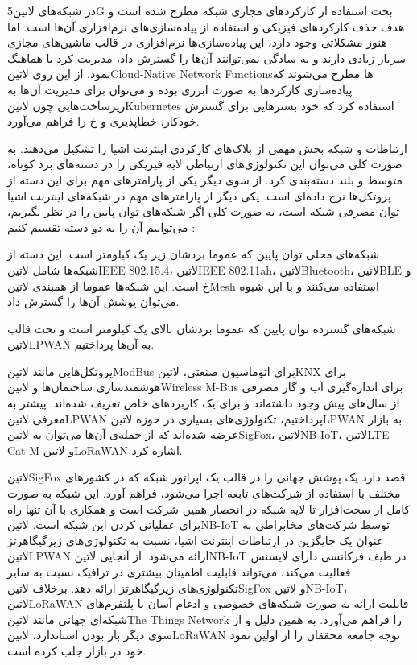 در شبکه‌های ‌لاتین{5G} بحث استفاده از کارکردهای مجازی شبکه مطرح شده است و هدف حذف کارکردهای فیزیکی
و استفاده از پیاده‌سازی‌های نرم‌افزاری آن‌ها است. اما هنوز مشکلاتی وجود دارد،
این پیاده‌سازی‌ها نرم‌افزاری در قالب ماشین‌های مجازی سربار زیادی دارند
و به سادگی نمی‌توانند آن‌ها را گسترش داد، مدیریت کرد یا هماهنگ نمود.
از این روی ‌لاتین{Cloud-Native Network Functions}ها مطرح می‌شوند که پیاده‌سازی کارکردها به صورت ابرزی بوده
و می‌توان برای مدیریت آن‌ها به زیرساخت‌هایی چون ‌لاتین{Kubernetes} استفاده کرد که خود بسترهایی برای
گسترش خودکار، خطاپذیری و ‌خ را فراهم می‌آورد.


ارتباطات و شبکه بخش مهمی از بلاک‌های کارکردی اینترنت اشیا را تشکیل می‌دهند. به صورت کلی می‌توان این تکنولوژی‌های ارتباطی لایه فیزیکی را در دسته‌های برد کوتاه، متوسط و بلند دسته‌بندی کرد.
از سوی دیگر یکی از پارامترهای مهم برای این دسته از پروتکل‌ها نرخ داده‌ای است. یکی دیگر از پارامترهای مهم در شبکه‌های اینترنت اشیا توان مصرفی شبکه است، به صورت کلی اگر شبکه‌های توان پایین را
در نظر بگیریم، می‌توانیم آن را به دو دسته تقسیم کنیم :

 شبکه‌های محلی توان پایین که عموما بردشان زیر یک کیلومتر است. این دسته از شبکه‌ها شامل ‌لاتین{IEEE 802.15.4}، ‌لاتین{IEEE 802.11ah}، ‌لاتین{Bluetooth}، ‌لاتین{BLE} و ‌خ است.
این شبکه‌ها عموما از همبندی ‌لاتین{Mesh} استفاده می‌کنند و با این شیوه می‌توان پوشش آن‌ها را گسترش داد.

 شبکه‌های گسترده توان پایین که عموما بردشان بالای یک کیلومتر است و تحت قالب ‌لاتین{LPWAN} به آن‌ها پرداختیم.

پروتکل‌هایی مانند ‌لاتین{ModBus} برای اتوماسیون صنعتی، ‌لاتین{KNX} برای هوشمند‌سازی ساختمان‌ها و ‌لاتین{Wireless M-Bus} برای اندازه‌گیری آب و گاز مصرفی از سال‌های پیش وجود داشته‌اند
و برای یک کاربردهای خاص تعریف شده‌اند.
پیشتر به معرفی ‌لاتین{LPWAN} پرداختیم، تکنولوژی‌های بسیاری در حوزه ‌لاتین{LPWAN} به بازار عرضه شده‌اند که از جمله‌ی آن‌ها می‌توان به ‌لاتین{SigFox}، ‌لاتین{NB-IoT}، ‌لاتین{LTE Cat-M} و ‌لاتین{LoRaWAN}
اشاره کرد.

‌لاتین{SigFox} قصد دارد یک پوشش جهانی را در قالب یک اپراتور شبکه که در کشورهای مختلف با استفاده از شرکت‌های تابعه اجرا می‌شود، فراهم آورد.
این شبکه به صورت کامل از سخت‌افزار تا لایه شبکه در انحصار همین شرکت است و همکاری با آن تنها راه برای عملیاتی کردن این شبکه است.
‌لاتین{NB-IoT} توسط شرکت‌های مخابراطی به عنوان یک جایگزین در ارتباطات اینترنت اشیا، نسبت به تکنولوژی‌های زیرگیگاهرتز ‌لاتین{LPWAN} ارائه می‌شود.
از آنجایی ‌لاتین{NB-IoT} در طیف فرکانسی دارای لایسنس فعالیت می‌کند، می‌تواند قابلیت اطمینان بیشتری در ترافیک نسبت به سایر تکنولوژی‌های زیرگیگاهرتز ارائه دهد.
برخلاف ‌لاتین{SigFox} و ‌لاتین{NB-IoT}، ‌لاتین{LoRaWAN} قابلیت ارائه به صورت شبکه‌های خصوصی و ادغام آسان با پلتفرم‌های شبکه‌ای جهانی مانند ‌لاتین{The Things Network} را فراهم می‌آورد.
به همین دلیل و از سوی دیگر باز بودن استاندارد، ‌لاتین{LoRaWAN} توجه جامعه محققان را از اولین نمود خود در بازار جلب کرده است.

